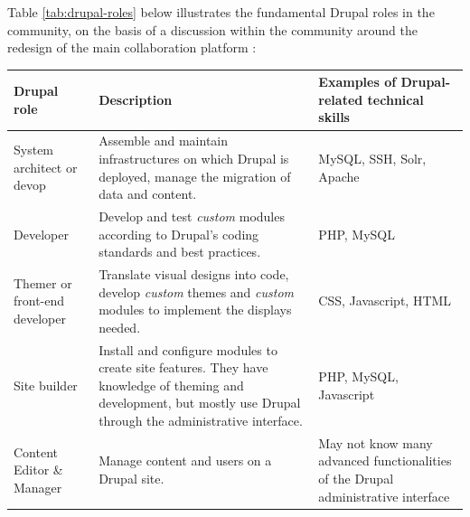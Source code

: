 Table \ref{tab:drupal-roles} below illustrates the fundamental Drupal roles in the community, on the basis of a discussion within the community around the redesign of the main collaboration platform \parencite{drupal-roles-development}:

\begin{footnotesize}
\begin{longtable}{|p{3cm}||p{7cm}|p{3cm}|}
\hline
Drupal role                   & Description                                                                                                                                                                                        & Examples of Drupal-related technical skills                                                         \\ \hline \hline
System architect or devop              & Assemble and maintain infrastructures on which Drupal is deployed, manage the migration of data and content.                                                                          & MySQL, SSH, Solr, Apache                                                                             \\ \hline
Developer                     & Develop and test \textit{custom} modules according to Drupal's coding standards and best practices.                                                                                                         & PHP, MySQL                                                                                           \\ \hline
Themer or front-end developer  & Translate visual designs into code, develop \textit{custom} themes and \textit{custom} modules to implement the displays needed.                                                                           & CSS, Javascript, HTML                                                                                \\ \hline
Site builder                  & Install and configure modules to create site features. They have knowledge of theming and development, but mostly use Drupal through the administrative interface.                         & PHP, MySQL, Javascript                                                                               \\ \hline
Content Editor \& Manager     & Manage content and users on a Drupal site.                                                                                                                                                          & May not know many advanced functionalities of the Drupal administrative interface                \\ \hline

\end{longtable}
\end{footnotesize}
